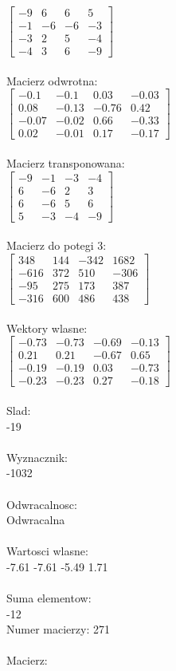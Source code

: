 \documentclass[a4paper,12pt]{article}
\begin{document}
$\begin{bmatrix} -9&6&6&5\\-1&-6&-6&-3\\-3&2&5&-4\\-4&3&6&-9 \end{bmatrix}$
\\
\\
Macierz odwrotna:\\

$\begin{bmatrix} -0.1&-0.1&0.03&-0.03\\0.08&-0.13&-0.76&0.42\\-0.07&-0.02&0.66&-0.33\\0.02&-0.01&0.17&-0.17 \end{bmatrix}$
\\
\\
Macierz transponowana:\\

$\begin{bmatrix} -9&-1&-3&-4\\6&-6&2&3\\6&-6&5&6\\5&-3&-4&-9 \end{bmatrix}$
\\
\\
Macierz do potegi 3:\\

$\begin{bmatrix} 348&144&-342&1682\\-616&372&510&-306\\-95&275&173&387\\-316&600&486&438 \end{bmatrix}$
\\
\\
Wektory wlasne:\\

$\begin{bmatrix} -0.73&-0.73&-0.69&-0.13\\0.21&0.21&-0.67&0.65\\-0.19&-0.19&0.03&-0.73\\-0.23&-0.23&0.27&-0.18 \end{bmatrix}$
\\
\\
Slad:\\
-19
\\
\\
Wyznacznik:\\
-1032
\\
\\
Odwracalnosc:\\
Odwracalna
\\
\\
Wartosci wlasne:\\
-7.61 -7.61 -5.49 1.71
\\
\\
Suma elementow:\\
-12
\\
\newpage
Numer macierzy:
271
\\
\\
Macierz:\\
\end{document}
